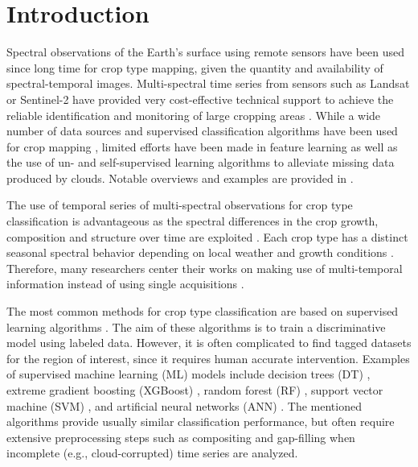 \documentclass[journal,article,submit,pdftex,moreauthors]{Definitions/mdpi}
\begin{document}

\section{Introduction}
Spectral observations of the Earth's surface using remote sensors have been used since long time for crop type mapping, 
given the quantity and availability of spectral-temporal images. 
Multi-spectral time series from sensors such as Landsat or Sentinel-2 have provided very cost-effective technical support to achieve the reliable identification and monitoring of large cropping areas \cite{Vuolo2018, Pelletier2019, Foerster2012, Chen2022, Tariq2022, Gao2021}. 
While a wide number of data sources and supervised classification algorithms have been used for crop mapping \cite{Palchowdhuri2018,Heupel2018,Li2023,Dong2020,Paris2020,Russwurm2020,Nowakowski2021,Chen2022,Gadiraju2023, Wu2022}, limited efforts have been made in feature learning as well as the use of un- and self-supervised learning algorithms to alleviate missing data produced by clouds. Notable overviews and examples are provided in \cite{Yin2020,Yi2020,He2022, Dumeur2024, Wang2019}.

The use of temporal series of multi-spectral observations for crop type classification is advantageous as the spectral differences in the crop growth, composition and structure over time are exploited \cite{Vuolo2018,Yi2020, Gao2021, Maponya2020}.
Each crop type has a distinct seasonal spectral behavior depending on local weather and growth conditions \cite{Foerster2012,Gao2021,Russwurm2020}. 
Therefore, many researchers center their works on making use of multi-temporal information instead of
using single acquisitions \cite{Hu2016,Vuolo2018, Dong2020, Roy2020}.

The most common methods for crop type classification are based on supervised learning algorithms \cite{Kussul2017,Inglada2017,Cai2018,Feng2019,Zhong2019,Maponya2020,Russwurm2020,Prins2020,Chen2022,ManishLad2022, Agilandeeswari2022,Wu2022,Gadiraju2023,Tian2023}. 
The aim of these algorithms is to train a discriminative model using labeled data. However, it is often complicated to find tagged datasets for the region of interest, since it requires human accurate intervention. Examples of supervised machine learning (ML) models include decision trees (DT) \cite{Rokach2005}, extreme gradient boosting (XGBoost) \cite{Chen2016}, random forest (RF) \cite{Breiman2001}, support vector machine (SVM) \cite{cortes1995}, and artificial neural networks (ANN) \cite{Rosenblatt1958}.
The mentioned algorithms provide usually similar classification performance, but often require extensive preprocessing steps such as compositing and gap-filling when incomplete (e.g., cloud-corrupted) time series are analyzed.
\end{document}
